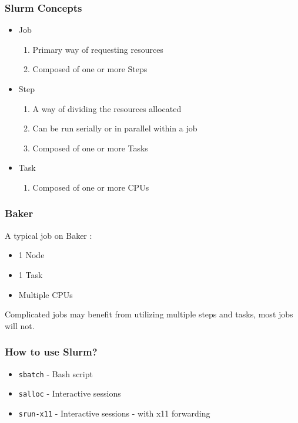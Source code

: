\documentclass{beamer}
\newcommand{\code}[1]{\colorbox{codegray}{\texttt{#1}}}
\begin{document}
\begin{frame}
\frametitle{Slurm Concepts}
\begin{itemize}
    \item Job
    \pause 
    \begin{enumerate}
        \item Primary way of requesting resources
        \pause
        \item Composed of one or more Steps
    \end{enumerate}
    \bigskip
    \pause
    \item Step
    \begin{enumerate}
        \item A way of dividing the resources allocated
        \pause
        \item Can be run serially or in parallel within a job
        \pause
        \item Composed of one or more Tasks
    \end{enumerate}
    \bigskip
    \pause
    \item Task
    \begin{enumerate}
        \item Composed of one or more CPUs
    \end{enumerate}
    \bigskip
\end{itemize}
\end{frame}



\begin{frame}
\frametitle{Baker}
A typical job on Baker : 
\bigskip
\begin{itemize}
    \item 1 Node 
    \bigskip
    \pause
    \item 1 Task
    \bigskip
    \pause
    \item Multiple CPUs
    \bigskip
    \pause
\end{itemize}
Complicated jobs may benefit from utilizing multiple steps and tasks, most jobs will not.
\end{frame}



\begin{frame}
\frametitle{How to use Slurm?}
\begin{itemize}
    \item \code{sbatch} - Bash script
    \bigskip
    \pause
    \item \code{salloc} - Interactive sessions
    \bigskip
    \pause
    \item \code{srun-x11} - Interactive sessions - with x11 forwarding
    \bigskip
\end{itemize}
\end{frame}
\end{document}
